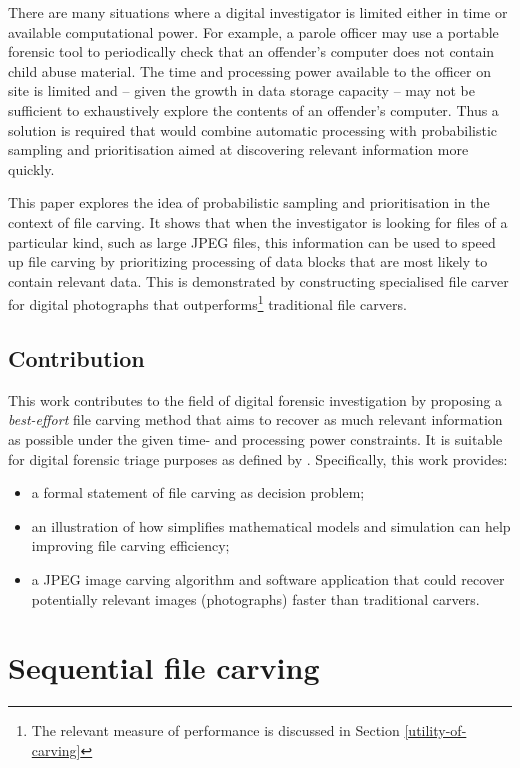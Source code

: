 \documentclass[final,5p,times,twocolumn,authoryear]{elsarticle}
\begin{document}
There are many situations where a digital investigator is limited either in time or available computational power. For example, a parole officer may use a portable forensic tool to periodically check that an offender's computer does not contain child abuse material. The time and processing power available to the officer on site is limited and -- given the growth in data storage capacity -- may not be sufficient to exhaustively explore the contents of an offender's computer. Thus a solution is required that would combine automatic processing with probabilistic sampling and prioritisation aimed at discovering relevant information more quickly.

This paper explores the idea of probabilistic sampling and prioritisation in the context of file carving. It shows that when the investigator is looking for files of a particular kind, such as large JPEG files, this information can be used to speed up file carving by prioritizing processing of data blocks that are most likely to contain relevant data. This is demonstrated by constructing specialised file carver for digital photographs that outperforms\footnote{The relevant measure of performance is discussed in Section \ref{utility-of-carving}} traditional file carvers.

\subsection{Contribution}
This work contributes to the field of digital forensic investigation by proposing a \emph{best-effort} file carving method that aims to recover as much relevant information as possible under the given time- and processing power constraints. It is suitable for digital forensic triage purposes as defined by \citep{Koopmans2013}. Specifically, this work provides:
\begin{itemize}
	\item{a formal statement of file carving as decision problem;}
	\item{an illustration of how simplifies mathematical models and simulation can help improving file carving efficiency;}
	\item{a JPEG image carving algorithm and software application that could recover potentially relevant images (photographs) faster than traditional carvers.}
\end{itemize}

\section{Sequential file carving}
\end{document}
